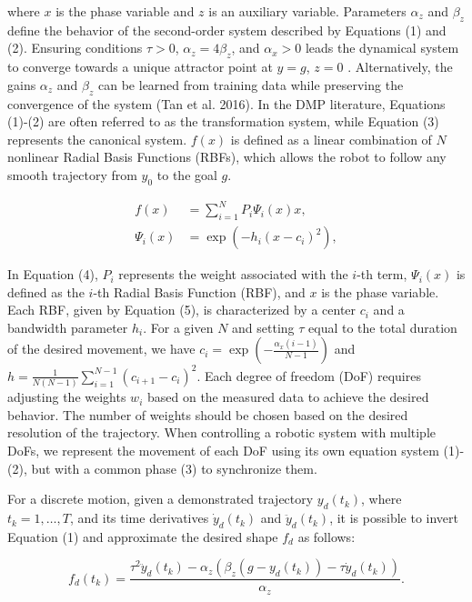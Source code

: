 \documentclass[conference]{IEEEtran}
\begin{document}
where $x$ is the phase variable and $z$ is an auxiliary variable. Parameters $\alpha_z$ and $\beta_z$ define the behavior of the second-order system described by Equations (1) and (2). Ensuring conditions $\tau > 0$, $\alpha_z = 4\beta_z$, and $\alpha_x > 0$ leads the dynamical system  to converge towards a unique attractor point at $y=g$, $z=0$ \cite{ijspeert_dynamical_2013}. Alternatively, the gains $\alpha_z$ and $\beta_z$ can be learned from training data while preserving the convergence of the system (Tan et al. 2016). In the DMP literature, Equations (1)-(2) are often referred to as the transformation system, while Equation (3) represents the canonical system. $f(x)$ is defined as a linear combination of $N$ nonlinear Radial Basis Functions (RBFs), which allows the robot to follow any smooth trajectory from  $y_0$ to the goal $g$.

\begin{align}
f(x) &= \sum_{i=1}^{N} P_i \Psi_i(x) x,  \\
\Psi_i(x) &= \exp \left(-h_i (x - c_i)^2\right),  
\end{align}

In Equation (4),  $P_i$ represents the weight associated with the $i$-th term, $\Psi_i(x)$ is defined as the $i$-th Radial Basis Function (RBF), and $x$ is the phase variable. Each RBF, given by Equation (5), is characterized by a center $c_i$ and a bandwidth parameter $h_i$.
For a given $N$ and setting $\tau$ equal to the total duration of the desired movement, we have $c_i = \exp\left(-\frac{\alpha_x(i-1)}{N-1}\right)$ and $h = \frac{1}{N(N-1)}\sum_{i=1}^{N-1}(c_{i+1}-c_i)^2$. Each degree of freedom (DoF) requires adjusting the weights $w_i$ based on the measured data to achieve the desired behavior. The number of weights should be chosen based on the desired resolution of the trajectory. When controlling a robotic system with multiple DoFs, we represent the movement of each DoF using its own equation system (1)-(2), but with a common phase (3) to synchronize them.

For a discrete motion, given a demonstrated trajectory $y_d(t_k)$, where $t_k = 1, \ldots, T$, and its time derivatives $\dot{y}_d(t_k)$ and $\ddot{y}_d(t_k)$, it is possible to invert Equation (1) and approximate the desired shape $f_d$ as follows:

\begin{equation}
f_d(t_k) = \frac{\tau^2 \ddot{y}_d(t_k) - \alpha_z \left(\beta_z (g - y_d(t_k)) - \tau \dot{y}_d(t_k)\right)}{\alpha_z}.
\label{eq:forcing-term}
\end{equation}
\end{document}
